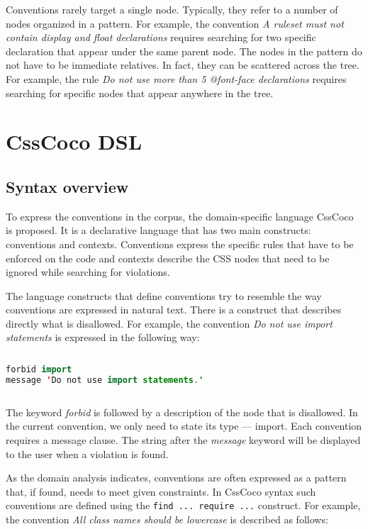 Conventions rarely target a single node. Typically, they refer to a number of
nodes organized in a pattern. For example, the convention \textit{A ruleset
must not contain display and float declarations} requires searching for two
specific declaration that appear under the same parent node. The nodes in the
pattern do not have to be immediate relatives. In fact, they can be scattered
across the tree. For example, the rule \textit{Do not use more than 5
@font-face declarations} requires searching for specific nodes that appear
anywhere in the tree.

\section{CssCoco DSL}

\subsection{Syntax overview}

To express the conventions in the corpus, the domain-specific language CssCoco
is proposed. It is a declarative language that has two main constructs:
conventions and contexts. Conventions express the specific rules that have to
be enforced on the code and contexts describe the CSS nodes that need to be
ignored while searching for violations.

The language constructs that define conventions try to resemble the way
conventions are expressed in natural text. There is a construct that describes
directly what is disallowed. For example, the convention \textit{Do not use
import statements} is expressed in the following way:

\begin{sourcecode}
\begin{lstlisting}[style=mono,language=Java]
forbid import
message 'Do not use import statements.'
\end{lstlisting}
\end{sourcecode}

The keyword \textit{forbid} is followed by a description of the node that is
disallowed. In the current convention, we only need to state its type ---
import. Each convention requires a message clause. The string after the
\textit{message} keyword will be displayed to the user when a violation is
found.

As the domain analysis indicates, conventions are often expressed as a pattern that, if found, needs to
meet given constraints. In CssCoco syntax such conventions are defined using the \texttt{find ...
require ...} construct. For example, the convention \textit{All class names should be lowercase} is
described as follows:


